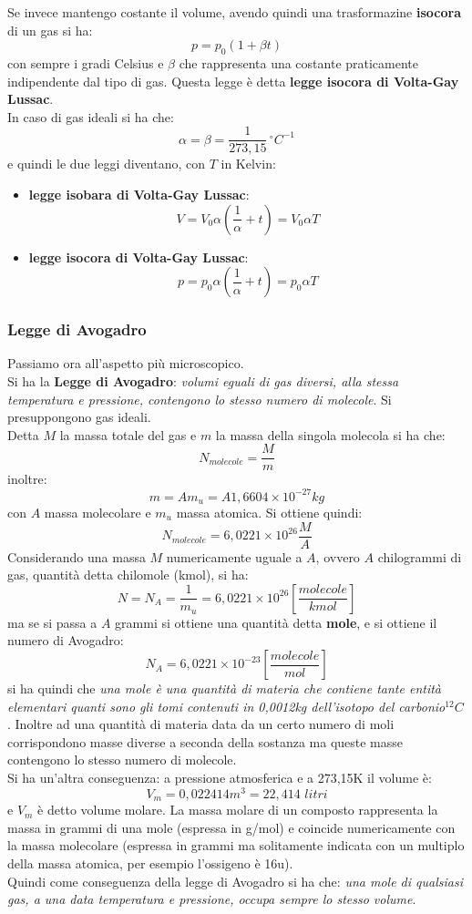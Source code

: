 \documentclass[a4paper,12pt, oneside]{book}
\begin{document}
Se invece mantengo costante il volume, avendo quindi una trasformazine \textbf{isocora} di un gas si ha:
$$p=p_0(1+\beta t)$$
con sempre i gradi Celsius e $\beta$ che rappresenta una costante praticamente indipendente dal tipo di gas. Questa legge è detta \textbf{legge isocora di Volta-Gay Lussac}.\\
In caso di gas ideali si ha che:
$$\alpha=\beta=\frac{1}{273,15}\, ^{\circ}C^{-1}$$
e quindi le due leggi diventano, con $T$ in Kelvin:
\begin{itemize}
	\item \textbf{legge isobara di Volta-Gay Lussac}:
	      $$V=V_0\alpha\left(\frac{1}{\alpha}+t\right)=V_0\alpha T$$
	\item \textbf{legge isocora di Volta-Gay Lussac}:
	      $$p=p_0\alpha\left(\frac{1}{\alpha}+t\right)=p_0\alpha T$$
\end{itemize}
\subsubsection{Legge di Avogadro}
Passiamo ora all'aspetto più microscopico.\\
Si ha la \textbf{Legge di Avogadro}: \textit{volumi eguali di gas diversi, alla stessa temperatura e pressione, contengono lo stesso numero di molecole}. Si presuppongono gas ideali.\\
Detta $M$ la massa totale del gas e $m$ la massa della singola molecola si ha che:
$$N_{molecole}=\frac{M}{m}$$
inoltre:
$$m=Am_u=A1,6604\times 10^{-27}kg$$
con $A$ massa molecolare e $m_u$ massa atomica. Si ottiene quindi:
$$N_{molecole}=6,0221\times 10^{26}\frac{M}{A}$$
Considerando una massa $M$ numericamente uguale a $A$, ovvero $A$ chilogrammi di gas, quantità detta chilomole (kmol), si ha:
$$N=N_A=\frac{1}{m_u}=6,0221\times 10^{26}\left[\frac{molecole}{kmol}\right]$$
ma se si passa a $A$ grammi si ottiene una quantità detta \textbf{mole}, e si ottiene il numero di Avogadro:
$$N_A=6,0221\times 10^{-23}\left[\frac{molecole}{mol}\right]$$
si ha quindi che \textit{una mole è una quantità di materia che contiene tante entità elementari quanti sono gli tomi contenuti in 0,0012kg dell'isotopo del carbonio}$^{12}C$. Inoltre ad una quantità di materia data da un certo numero di moli corrispondono masse diverse a seconda della sostanza ma queste masse contengono lo stesso numero di molecole.\\
Si ha un'altra conseguenza: a pressione atmosferica e a 273,15K il volume è:
$$V_m=0,022414m^3=22,414\,\,litri$$
e $V_m$ è detto volume molare. La massa molare di un composto rappresenta la massa in grammi di una mole (espressa in g/mol) e coincide numericamente con la massa molecolare (espressa in grammi ma solitamente indicata con un multiplo della massa atomica, per esempio l'ossigeno è 16u).\\
Quindi come conseguenza della legge di Avogadro si ha che: \textit{una mole di qualsiasi gas, a una data temperatura e pressione, occupa sempre lo stesso volume}.\\
\end{document}
